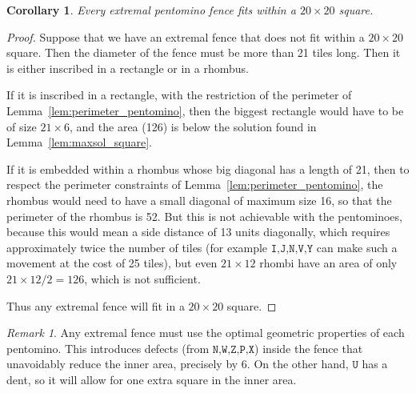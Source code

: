 \documentclass{amsart}
\newtheorem{corollary}[theorem]{Corollary}
\theoremstyle{definition}
\theoremstyle{remark}
\newtheorem*{remark}{Remark}
\newcommand{\polfont}[1]{\texttt{#1}}
\begin{document}
	\begin{corollary}\label{coro:sizeboardpentomino}
		Every extremal pentomino fence fits within a $20\times 20$ square.
	\end{corollary}
	\begin{proof}
		Suppose that we have an extremal fence that does not fit within a $20\times 20$ square. Then the diameter of the fence must be more than 21 tiles long. Then it is either inscribed in a rectangle or in a rhombus.
		
		If it is inscribed in a rectangle, with the restriction of the perimeter of Lemma~\ref{lem:perimeter_pentomino}, then the biggest rectangle would have to be of size $21\times 6$, and the area (126) is below the solution found in Lemma~\ref{lem:maxsol_square}. 
		
		If it is embedded within a rhombus whose big diagonal has a length of 21, then to respect the perimeter constraints of Lemma~\ref{lem:perimeter_pentomino}, the rhombus would need to have a small diagonal of maximum size 16, so that the perimeter of the rhombus is 52. But this is not achievable with the pentominoes, because this would mean a side distance of 13 units diagonally, which requires approximately twice the number of tiles (for example $\polfont{I,J,N,V,Y}$ can make such a movement at the cost of 25 tiles), but even $21\times 12$ rhombi have an area of only $21\times 12/2=126$, which is not sufficient. 
		
		Thus any extremal fence will fit in a $20­\times 20$ square.
	\end{proof}
	
	
	\begin{remark}
		Any extremal fence must use the optimal geometric properties of each pentomino. This introduces defects (from $\polfont{N,W,Z,P,X}$) inside the fence that unavoidably reduce the inner area, precisely by 6. On the other hand, $\polfont{U}$ has a dent, so it will allow for one extra square in the inner area.
	\end{remark}
	
	
	
\end{document}
